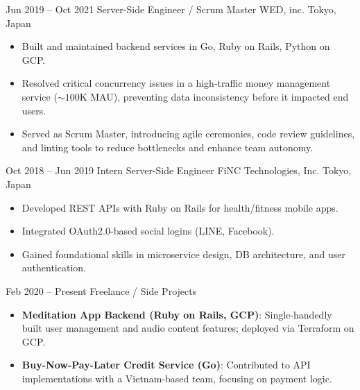 \documentclass[11pt,letterpaper]{moderncv}
\begin{document}
\cventry
    {Jun 2019 -- Oct 2021}
    {Server-Side Engineer / Scrum Master}
    {WED, inc.}
    {Tokyo, Japan}
    {}
    {
      \begin{itemize}
        \item Built and maintained backend services in Go, Ruby on Rails, Python on GCP.
        \item Resolved critical concurrency issues in a high-traffic money management service ($\sim100\mathrm{K}$ MAU), preventing data inconsistency before it impacted end users.
        \item Served as Scrum Master, introducing agile ceremonies, code review guidelines, and linting tools to reduce bottlenecks and enhance team autonomy.
      \end{itemize}
    }

\cventry
    {Oct 2018 -- Jun 2019}
    {Intern Server-Side Engineer}
    {FiNC Technologies, Inc.}
    {Tokyo, Japan}
    {}
    {
      \begin{itemize}
        \item Developed REST APIs with Ruby on Rails for health/fitness mobile apps.
        \item Integrated OAuth2.0-based social logins (LINE, Facebook).
        \item Gained foundational skills in microservice design, DB architecture, and user authentication.
      \end{itemize}
    }

\cventry
    {Feb 2020 -- Present}
    {Freelance / Side Projects}
    {}
    {}
    {}
    {
      \begin{itemize}
        \item \textbf{Meditation App Backend (Ruby on Rails, GCP)}:
        Single-handedly built user management and audio content features; deployed via Terraform on GCP.
        \item \textbf{Buy-Now-Pay-Later Credit Service (Go)}:
        Contributed to API implementations with a Vietnam-based team, focusing on payment logic.
      \end{itemize}
    }

\end{document}
